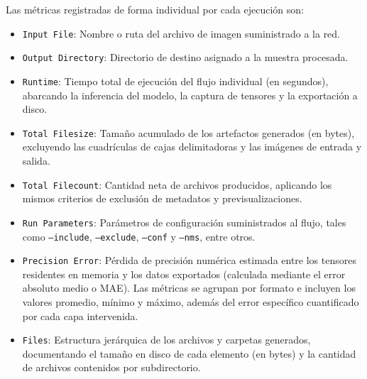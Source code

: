 Las métricas registradas de forma individual por cada ejecución son:
\begin{itemize}
    \item \texttt{Input File}: Nombre o ruta del archivo de imagen suministrado a la red.
    \item \texttt{Output Directory}: Directorio de destino asignado a la muestra procesada.
    \item \texttt{Runtime}: Tiempo total de ejecución del flujo individual (en segundos), abarcando la inferencia del modelo, 
    la captura de tensores y la exportación a disco.
    \item \texttt{Total Filesize}: Tamaño acumulado de los artefactos generados (en bytes), excluyendo las cuadrículas de cajas 
    delimitadoras y las imágenes de entrada y salida.
    \item \texttt{Total Filecount}: Cantidad neta de archivos producidos, aplicando los mismos criterios de exclusión de metadatos 
    y previsualizaciones.
    \item \texttt{Run Parameters}: Parámetros de configuración suministrados al flujo, tales como \texttt{--include}, 
    \texttt{--exclude}, \texttt{--conf} y \texttt{--nms}, entre otros.
    \item \texttt{Precision Error}: Pérdida de precisión numérica estimada entre los tensores residentes en memoria y los 
    datos exportados (calculada mediante el error absoluto medio o MAE). Las métricas se agrupan por formato e incluyen 
    los valores promedio, mínimo y máximo, además del error específico cuantificado por cada capa intervenida.
    \item \texttt{Files}: Estructura jerárquica de los archivos y carpetas generados, documentando el tamaño en disco de 
    cada elemento (en bytes) y la cantidad de archivos contenidos por subdirectorio.
\end{itemize}

